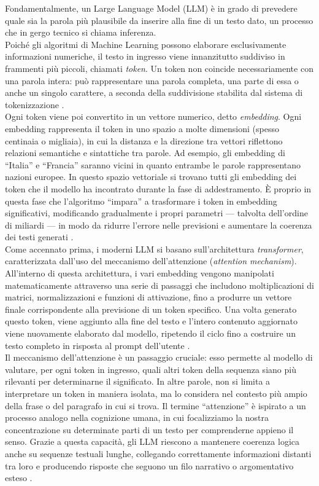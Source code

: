 Fondamentalmente, un Large Language Model (LLM) è in grado di prevedere quale sia la parola più plausibile da inserire alla fine di un testo dato, un processo che in gergo tecnico si chiama inferenza. \cite{LLM_next_token_prediction} \\
Poiché gli algoritmi di Machine Learning possono elaborare esclusivamente informazioni numeriche, il testo in ingresso viene innanzitutto suddiviso in frammenti più piccoli, chiamati \textit{token}. Un token non coincide necessariamente con una parola intera: può rappresentare una parola completa, una parte di essa o anche un singolo carattere, a seconda della suddivisione stabilita dal sistema di tokenizzazione \cite{tokens_tokenization}. \\
Ogni token viene poi convertito in un vettore numerico, detto \textit{embedding}. Ogni embedding rappresenta il token in uno spazio a molte dimensioni (spesso centinaia o migliaia), in cui la distanza e la direzione tra vettori riflettono relazioni semantiche e sintattiche tra parole. Ad esempio, gli embedding di “Italia” e “Francia” saranno vicini in quanto entrambe le parole rappresentano nazioni europee. In questo spazio vettoriale si trovano tutti gli embedding dei token che il modello ha incontrato durante la fase di addestramento. È proprio in questa fase che l'algoritmo “impara” a trasformare i token in embedding significativi, modificando gradualmente i propri parametri — talvolta dell'ordine di miliardi — in modo da ridurre l'errore nelle previsioni e aumentare la coerenza dei testi generati \cite{LLM_fine_tuning}. \\
Come accennato prima, i moderni LLM si basano sull'architettura \textit{transformer}, caratterizzata dall'uso del meccanismo dell'attenzione (\textit{attention mechanism}). All'interno di questa architettura, i vari embedding vengono manipolati matematicamente attraverso una serie di passaggi che includono moltiplicazioni di matrici, normalizzazioni e funzioni di attivazione, fino a produrre un vettore finale corrispondente alla previsione di un token specifico. Una volta generato questo token, viene aggiunto alla fine del testo e l'intero contenuto aggiornato viene nuovamente elaborato dal modello, ripetendo il ciclo fino a costruire un testo completo in risposta al prompt dell'utente \cite{transformer_self_attention}. \\
Il meccanismo dell'attenzione è un passaggio cruciale: esso permette al modello di valutare, per ogni token in ingresso, quali altri token della sequenza siano più rilevanti per determinarne il significato. In altre parole, non si limita a interpretare un token in maniera isolata, ma lo considera nel contesto più ampio della frase o del paragrafo in cui si trova. Il termine “attenzione” è ispirato a un processo analogo nella cognizione umana, in cui focalizziamo la nostra concentrazione su determinate parti di un testo per comprenderne appieno il senso. Grazie a questa capacità, gli LLM riescono a mantenere coerenza logica anche su sequenze testuali lunghe, collegando correttamente informazioni distanti tra loro e producendo risposte che seguono un filo narrativo o argomentativo esteso \cite{attention_human_cognition}. \\

